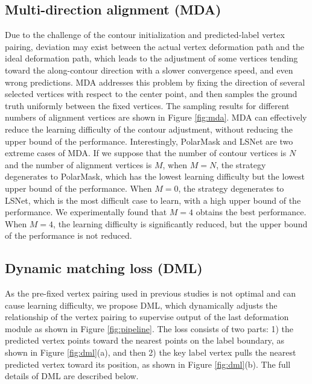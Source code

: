 \documentclass[10pt,twocolumn,letterpaper]{article}
\begin{document}
\subsection{Multi-direction alignment (MDA)}
Due to the challenge of the contour initialization and predicted-label vertex pairing, deviation may exist between the actual vertex deformation path and the ideal deformation path, which leads to the adjustment of some vertices tending toward the along-contour direction with a slower convergence speed, and even wrong predictions. MDA addresses this problem by fixing the direction of several selected vertices with respect to the center point, and then samples the ground truth uniformly between the fixed vertices. The sampling results for different numbers of alignment vertices are shown in Figure \ref{fig:mda}. MDA can effectively reduce the learning difficulty of the contour adjustment, without reducing the upper bound of the performance. Interestingly, PolarMask and LSNet are two extreme cases of MDA. If we suppose that the number of contour vertices is $N$ and the number of alignment vertices is $M$, when $M=N$, the strategy degenerates to PolarMask, which has the lowest learning difficulty but the lowest upper bound of the performance. When $M=0$, the strategy degenerates to LSNet, which is the most difficult case to learn, with a high upper bound of the performance. We experimentally found that $M=4$ obtains the best performance. When $M=4$, the learning difficulty is significantly reduced, but the upper bound of the performance is not reduced.

\subsection{Dynamic matching loss (DML)}
As the pre-fixed vertex pairing used in previous studies is not optimal and can cause learning difficulty, we propose DML, which dynamically adjusts the relationship of the vertex pairing to supervise output of the last deformation module \cite{deepsnake} as shown in Figure \ref{fig:pipeline}. The loss consists of two parts: 1) the predicted vertex points toward the nearest points on the label boundary, as shown in Figure \ref{fig:dml}(a), and then 2) the key label vertex pulls the nearest predicted vertex toward its position, as shown in Figure \ref{fig:dml}(b). The full details of DML are described below.
\end{document}
